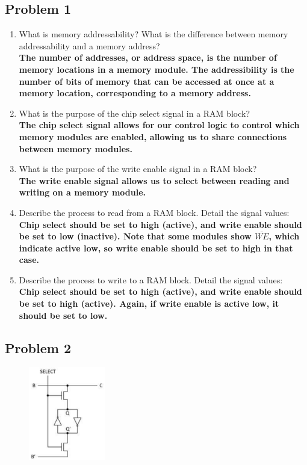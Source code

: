 \documentclass{article}
\begin{document}
\subsection*{Problem 1}

\begin{enumerate}[label=\alph*.]
\item What is memory addressability? What is the difference between memory addressability and a memory address? \\
\textbf{The number of addresses, or address space, is the number of memory locations in a memory module. The addressibility is the number of bits of memory that can be accessed at once at a memory location, corresponding to a memory address.}
\item What is the purpose of the chip select signal in a RAM block? \\
\textbf{The chip select signal allows for our control logic to control which memory modules are enabled, allowing us to share connections between memory modules.}
\item What is the purpose of the write enable signal in a RAM block? \\
\textbf{The write enable signal allows us to select between reading and writing on a memory module.}
\item Describe the process to read from a RAM block. Detail the signal values: \\
\textbf{Chip select should be set to high (active), and write enable should be set to low (inactive). Note that some modules show $\overline{WE}$, which indicate active low, so write enable should be set to high in that case.}
\item Describe the process to write to a RAM block. Detail the signal values: \\
\textbf{Chip select should be set to high (active), and write enable should be set to high (active). Again, if write enable is active low, it should be set to low. }

\end{enumerate}
\newpage
\subsection*{Problem 2}
\begin{figure}[!h]
    \centering
    \includegraphics[width=0.3\textwidth]{figures/memory_q2.png}
\end{figure}
\end{document}
